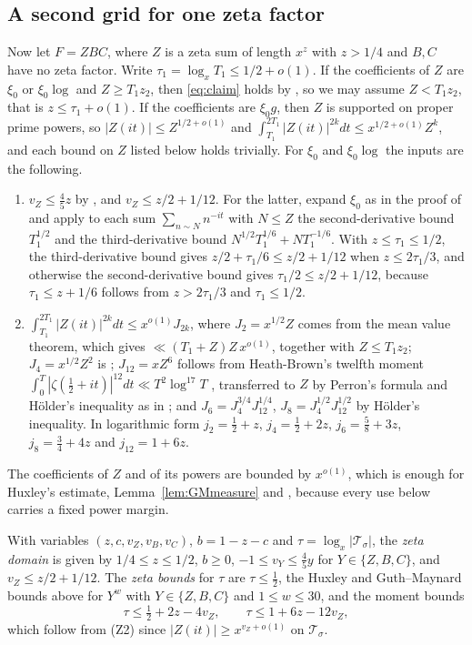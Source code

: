 \documentclass[11pt]{amsart}
\theoremstyle{definition}
\theoremstyle{remark}
\begin{document}
\subsection*{A second grid for one zeta factor}
Now let $F=ZBC$, where $Z$ is a zeta sum of length $x^{z}$ with $z>1/4$ and $B,C$ have no zeta factor. Write $\tau_1=\log_xT_1\le 1/2+o(1)$. If the coefficients of $Z$ are $\xi_0$ or $\xi_0\log$ and $Z\ge T_1z_2$, then \eqref{eq:claim} holds by \cite[Lemma~5.4]{J}, so we may assume $Z<T_1z_2$, that is $z\le\tau_1+o(1)$. If the coefficients are $\xi_0g$, then $Z$ is supported on proper prime powers, so $|Z(it)|\le Z^{1/2+o(1)}$ and $\int_{T_1}^{2T_1}|Z(it)|^{2k}dt\le x^{1/2+o(1)}Z^{k}$, and each bound on $Z$ listed below holds trivially. For $\xi_0$ and $\xi_0\log$ the inputs are the following.
\begin{enumerate}[(Z1)]
\item $v_Z\le\frac45 z$ by \cite[Lemma~5.8]{J}, and $v_Z\le z/2+1/12$. For the latter, expand $\xi_0$ as in the proof of \cite[Lemma~5.4]{J} and apply to each sum $\sum_{n\sim N}n^{-it}$ with $N\le Z$ the second-derivative bound $T_1^{1/2}$ and the third-derivative bound $N^{1/2}T_1^{1/6}+NT_1^{-1/6}$. With $z\le\tau_1\le 1/2$, the third-derivative bound gives $z/2+\tau_1/6\le z/2+1/12$ when $z\le 2\tau_1/3$, and otherwise the second-derivative bound gives $\tau_1/2\le z/2+1/12$, because $\tau_1\le z+1/6$ follows from $z>2\tau_1/3$ and $\tau_1\le1/2$.
\item $\int_{T_1}^{2T_1}|Z(it)|^{2k}dt\le x^{o(1)}J_{2k}$, where $J_2=x^{1/2}Z$ comes from the mean value theorem, which gives $\ll(T_1+Z)Z\,x^{o(1)}$, together with $Z\le T_1z_2$; $J_4=x^{1/2}Z^2$ is \cite[Lemma~5.7]{J}; $J_{12}=xZ^6$ follows from Heath-Brown's twelfth moment $\int_0^T|\zeta(\tfrac12+it)|^{12}dt\ll T^2\log^{17}T$ \cite{HB12}, transferred to $Z$ by Perron's formula and Hölder's inequality as in \cite[Lemmas~5.5 and~5.6]{J}; and $J_6=J_4^{3/4}J_{12}^{1/4}$, $J_8=J_4^{1/2}J_{12}^{1/2}$ by Hölder's inequality. In logarithmic form $j_2=\frac12+z$, $j_4=\frac12+2z$, $j_6=\frac58+3z$, $j_8=\frac34+4z$ and $j_{12}=1+6z$.
\end{enumerate}
The coefficients of $Z$ and of its powers are bounded by $x^{o(1)}$, which is enough for Huxley's estimate, Lemma~\ref{lem:GMmeasure} and \cite[Proposition~2.2]{J}, because every use below carries a fixed power margin.

With variables $(z,c,v_Z,v_B,v_C)$, $b=1-z-c$ and $\tau=\log_x|\mathcal T_\sigma|$, the \emph{zeta domain} is given by $1/4\le z\le 1/2$, $b\ge0$, $-1\le v_Y\le\frac45y$ for $Y\in\{Z,B,C\}$, and $v_Z\le z/2+1/12$. The \emph{zeta bounds} for $\tau$ are $\tau\le\frac12$, the Huxley and Guth--Maynard bounds above for $Y^w$ with $Y\in\{Z,B,C\}$ and $1\le w\le 30$, and the moment bounds
\[
\tau\le \tfrac12+2z-4v_Z,\qquad \tau\le 1+6z-12v_Z,
\]
which follow from (Z2) since $|Z(it)|\ge x^{v_Z+o(1)}$ on $\mathcal T_\sigma$.
\end{document}
